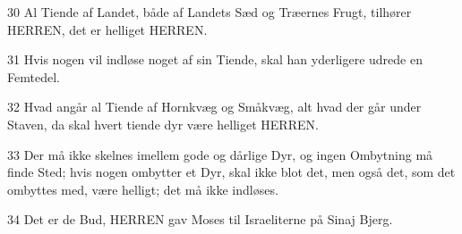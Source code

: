 \par 30 Al Tiende af Landet, både af Landets Sæd og Træernes Frugt, tilhører HERREN, det er helliget HERREN.
\par 31 Hvis nogen vil indløse noget af sin Tiende, skal han yderligere udrede en Femtedel.
\par 32 Hvad angår al Tiende af Hornkvæg og Småkvæg, alt hvad der går under Staven, da skal hvert tiende dyr være helliget HERREN.
\par 33 Der må ikke skelnes imellem gode og dårlige Dyr, og ingen Ombytning må finde Sted; hvis nogen ombytter et Dyr, skal ikke blot det, men også det, som det ombyttes med, være helligt; det må ikke indløses.
\par 34 Det er de Bud, HERREN gav Moses til Israeliterne på Sinaj Bjerg.


